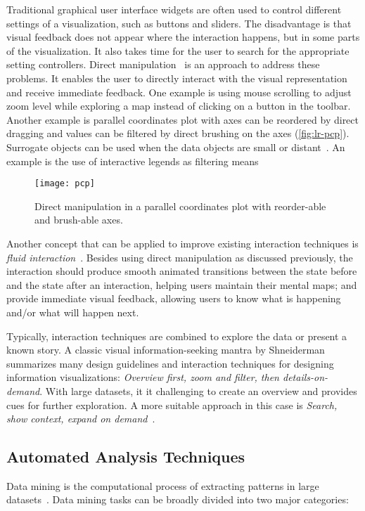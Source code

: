 Traditional graphical user interface widgets are often used to control different settings of a visualization, such as buttons and sliders. The disadvantage is that visual feedback does not appear where the interaction happens, but in some parts of the visualization. It also takes time for the user to search for the appropriate setting controllers. Direct manipulation~\cite{Shneiderman1982} is an approach to address these problems. It enables the user to directly interact with the visual representation and receive immediate feedback. One example is using mouse scrolling to adjust zoom level while exploring a map instead of clicking on a button in the toolbar. Another example is parallel coordinates plot with axes can be reordered by direct dragging and values can be filtered by direct brushing on the axes (\autoref{fig:lr-pcp}). Surrogate objects can be used when the data objects are small or distant~\cite{Kwon2011}. An example is the use of interactive legends as filtering means~\cite{Riche2010b}

\begin{figure}[!htb]
	\centering
	\texttt{[image: pcp]}
	\caption{Direct manipulation in a parallel coordinates plot with reorder-able and brush-able axes.}
	\label{fig:lr-pcp}
\end{figure}

Another concept that can be applied to improve existing interaction techniques is \emph{fluid interaction}~\cite{Elmqvist2011}. Besides using direct manipulation as discussed previously, the interaction should produce smooth animated transitions between the state before and the state after an interaction, helping users maintain their mental maps; and provide immediate visual feedback, allowing users to know what is happening and/or what will happen next.

Typically, interaction techniques are combined to explore the data or present a known story. A classic visual information-seeking mantra by Shneiderman~\cite{Shneiderman1996} summarizes many design guidelines and interaction techniques for designing information visualizations: \emph{Overview first, zoom and filter, then details-on-demand}. With large datasets, it it challenging to create an overview and provides cues for further exploration. A more suitable approach in this case is \emph{Search, show context, expand on demand}~\cite{VanHam2009}.

\subsection{Automated Analysis Techniques}
\label{sub:lr-analysis}
Data mining is the computational process of extracting patterns in large datasets~\cite{Tan2006}. Data mining tasks can be broadly divided into two major categories:

